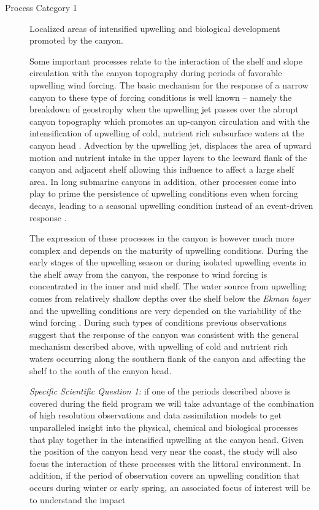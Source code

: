 \begin{description}
  
\item[Process Category 1] Localized areas of intensified upwelling and
  biological development promoted by the canyon.

  Some important processes relate to the interaction of the shelf and
  slope circulation with the canyon topography during periods of
  favorable upwelling wind forcing. The basic mechanism for the
  response of a narrow canyon to these type of forcing conditions is
  well known -- namely the breakdown of geostrophy when the upwelling
  jet passes over the abrupt canyon topography which promotes an
  up-canyon circulation and with the intensification of upwelling of
  cold, nutrient rich subsurface waters at the canyon head
  \cite{klinck96,she00}. Advection by the upwelling jet, displaces the
  area of upward motion and nutrient intake in the upper layers to the
  leeward flank of the canyon and adjacent shelf allowing this
  influence to affect a large shelf area. In long submarine canyons in
  addition, other processes come into play to prime the persistence of
  upwelling conditions even when forcing decays, leading to a seasonal
  upwelling condition instead of an event-driven response
  \cite{allen00,waterhouse09}.

  The expression of these processes in the \naz canyon is however much
  more complex and depends on the maturity of upwelling
  conditions. During the early stages of the upwelling season or
  during isolated upwelling events in the shelf away from the canyon,
  the response to wind forcing is concentrated in the inner and mid
  shelf. The water source from upwelling comes from relatively shallow
  depths over the shelf below the \emph{Ekman layer} and the upwelling
  conditions are very depended on the variability of the wind forcing
  . During such types of conditions previous observations
  suggest that the response of the \naz canyon was consistent with the
  general mechanism described above, with upwelling of cold and
  nutrient rich waters occurring along the southern flank of the
  canyon and affecting the shelf to the south of the canyon head.
 
  \textsl{Specific Scientific Question 1:} if one of the periods
  described above is covered during the \proj field program we will
  take advantage of the combination of high resolution observations
  and data assimilation models to get unparalleled insight into the
  physical, chemical and biological processes that play together in
  the intensified upwelling at the \naz canyon head. Given the
  position of the canyon head very near the coast, the study will also
  focus the interaction of these processes with the littoral
  environment. In addition, if the period of observation covers an
  upwelling condition that occurs during winter or early
  spring, an associated focus of interest will be to understand the
  impact 
 

\end{description}
